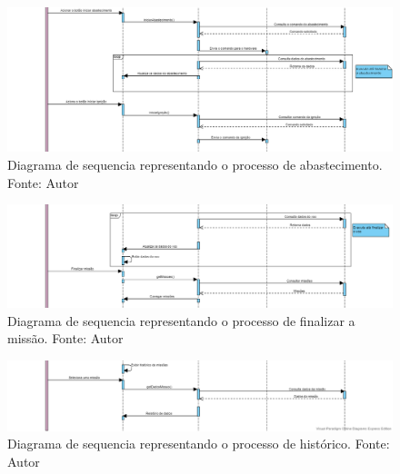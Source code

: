 \begin{apendicesenv}
\begin{figure}[htb]
    \centering
    \includegraphics[width=1\textwidth, angle=0]{figuras/diagrama_sequencia_abastecimento.png}
    \caption{Diagrama de sequencia representando o processo de abastecimento. Fonte: Autor}
    \label{fig:Diagrama_sequencia_abastecimento}
\end{figure}

\begin{figure}[htb]
    \centering
    \includegraphics[width=1\textwidth, angle=0]{figuras/diagrama_sequencia_finaliza_missao.png}
    \caption{Diagrama de sequencia representando o processo de finalizar a missão. Fonte: Autor}
    \label{fig:Diagrama_sequencia_finaliza_missao}
\end{figure}

\begin{figure}[htb]
    \centering
    \includegraphics[width=1\textwidth, angle=0]{figuras/diagrama_sequencia_historico.png}
    \caption{Diagrama de sequencia representando o processo de histórico. Fonte: Autor}
    \label{fig:Diagrama_sequencia_historico}
\end{figure}






\end{apendicesenv}
